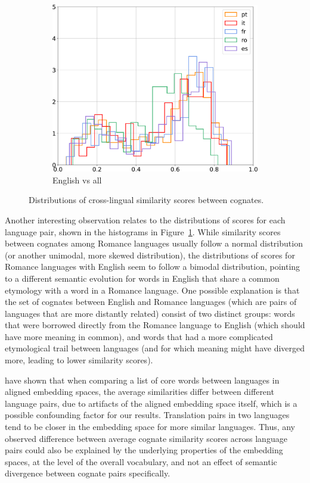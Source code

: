 \documentclass[output=paper]{langsci/langscibook}
\begin{document}
\begin{figure}[!ht]
\begin{subfigure}{0.30\textwidth}
        \includegraphics[width=\linewidth]{figures/UBAN_histogram_distances_en_all_contour_complete}
        \caption{English vs all}
    \end{subfigure}
    
    \caption{\label{fig:exp1}Distributions of cross-lingual similarity scores between cognates.}
\end{figure}

Another interesting observation relates to the distributions of scores for each language pair, shown in the histograms in Figure~\ref{fig:exp1}. While similarity scores between cognates among Romance languages usually follow a normal distribution (or another unimodal, more skewed distribution), the distributions of scores for Romance languages with English seem to follow a bimodal distribution, pointing to a different semantic evolution for words in English that share a common etymology with a word in a Romance language. One possible explanation is that the set of cognates between English and Romance languages (which are pairs of languages that are more distantly related) consist of two distinct groups: words that were borrowed directly from the Romance language to English (which should have more meaning in common), and words that had a more complicated etymological trail between languages (and for which meaning might have diverged more, leading to lower similarity scores). 

\citet{cognatesuban:beinborn2019semantic} have shown that when comparing a list of core words between languages in aligned embedding spaces, the average similarities differ between different language pairs, due to artifacts of the aligned embedding space itself, which is a possible confounding factor for our results. Translation pairs in two languages tend to be closer in the embedding space for more similar languages. Thus, any observed difference between average cognate similarity scores across language pairs could also be explained by the underlying properties of the embedding spaces, at the level of the overall vocabulary, and not an effect of semantic divergence between cognate pairs specifically.
\end{document}
